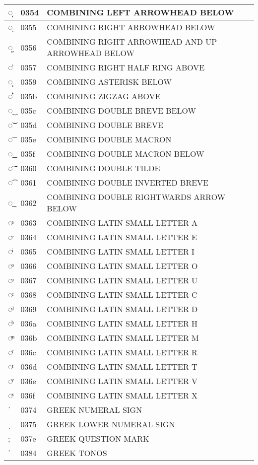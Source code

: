 \documentclass[12pt,letterpaper,openany]{book}
\begin{document}
\begin{center}
\begin{supertabular}{|m{0.25in}|m{0.5in}|m{4in}|}
◌͔ & 0354 & COMBINING LEFT ARROWHEAD BELOW\\\hline
◌͕ & 0355 & COMBINING RIGHT ARROWHEAD BELOW\\\hline
◌͖ & 0356 & COMBINING RIGHT ARROWHEAD AND UP ARROWHEAD BELOW\\\hline
◌͗ & 0357 & COMBINING RIGHT HALF RING ABOVE\\\hline
◌͙ & 0359 & COMBINING ASTERISK BELOW\\\hline
◌͛ & 035b & COMBINING ZIGZAG ABOVE\\\hline
◌͜ & 035c & COMBINING DOUBLE BREVE BELOW\\\hline
◌͝ & 035d & COMBINING DOUBLE BREVE\\\hline
◌͞ & 035e & COMBINING DOUBLE MACRON\\\hline
◌͟ & 035f & COMBINING DOUBLE MACRON BELOW\\\hline
◌͠ & 0360 & COMBINING DOUBLE TILDE\\\hline
◌͡ & 0361 & COMBINING DOUBLE INVERTED BREVE\\\hline
◌͢ & 0362 & COMBINING DOUBLE RIGHTWARDS ARROW BELOW\\\hline
◌ͣ & 0363 & COMBINING LATIN SMALL LETTER A\\\hline
◌ͤ & 0364 & COMBINING LATIN SMALL LETTER E\\\hline
◌ͥ & 0365 & COMBINING LATIN SMALL LETTER I\\\hline
◌ͦ & 0366 & COMBINING LATIN SMALL LETTER O\\\hline
◌ͧ & 0367 & COMBINING LATIN SMALL LETTER U\\\hline
◌ͨ & 0368 & COMBINING LATIN SMALL LETTER C\\\hline
◌ͩ & 0369 & COMBINING LATIN SMALL LETTER D\\\hline
◌ͪ & 036a & COMBINING LATIN SMALL LETTER H\\\hline
◌ͫ & 036b & COMBINING LATIN SMALL LETTER M\\\hline
◌ͬ & 036c & COMBINING LATIN SMALL LETTER R\\\hline
◌ͭ & 036d & COMBINING LATIN SMALL LETTER T\\\hline
◌ͮ & 036e & COMBINING LATIN SMALL LETTER V\\\hline
◌ͯ & 036f & COMBINING LATIN SMALL LETTER X\\\hline
ʹ & 0374 & GREEK NUMERAL SIGN\\\hline
͵ & 0375 & GREEK LOWER NUMERAL SIGN\\\hline
; & 037e & GREEK QUESTION MARK\\\hline
΄ & 0384 & GREEK TONOS\\\hline

\end{supertabular}
\end{center}
\end{document}
